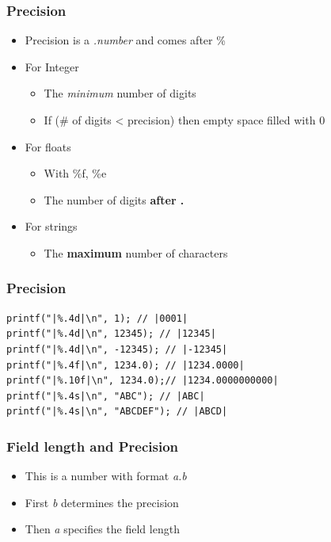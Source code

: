 \documentclass{../c-lecture}
\begin{document}
\begin{frame}
  \frametitle{Precision}
  \begin{itemize}
    \item Precision is a \textit{\color{LimeGreen} .number} and comes after \%

    \item For Integer
    \begin{itemize}
      \item The \textit{\color{LimeGreen} minimum} number of digits
      \item If (\# of digits < precision) then empty space filled with 0
    \end{itemize}

    \item For floats
    \begin{itemize}
      \item With \%f, \%e
      \item The number of digits \textbf{\color{Cyan} after .}
    \end{itemize}

    \item For strings
    \begin{itemize}
      \item The \textbf{\color{Orange} maximum} number of characters
    \end{itemize}
  \end{itemize}
\end{frame}

\begin{frame}[fragile]
  \frametitle{Precision}
  \begin{verbatim}
printf("|%.4d|\n", 1); // |0001|
printf("|%.4d|\n", 12345); // |12345|
printf("|%.4d|\n", -12345); // |-12345|
printf("|%.4f|\n", 1234.0); // |1234.0000|
printf("|%.10f|\n", 1234.0);// |1234.0000000000|
printf("|%.4s|\n", "ABC"); // |ABC|
printf("|%.4s|\n", "ABCDEF"); // |ABCD|
  \end{verbatim}
\end{frame}

\begin{frame}
  \frametitle{Field length and Precision}
  \begin{itemize}
    \item This is a number with format \textit{\color{Cyan} a.b}
    \item First \textit{\color{Orange} b} determines the precision
    \item Then \textit{\color{LimeGreen} a} specifies the field length
  \end{itemize}
\end{frame}
\end{document}
